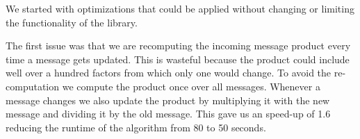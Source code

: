 We started with optimizations that could be applied without changing or limiting the functionality of the library.

The first issue was that we are recomputing the incoming message product every time a message gets updated. This is wasteful because the product could include well over a hundred factors from which only one would change. To avoid the re-computation we compute the product once over all messages. Whenever a message changes we also update the product by multiplying it with the new message and dividing it by the old message. This gave us an speed-up of 1.6 reducing the runtime of the algorithm from 80 to 50 seconds.



